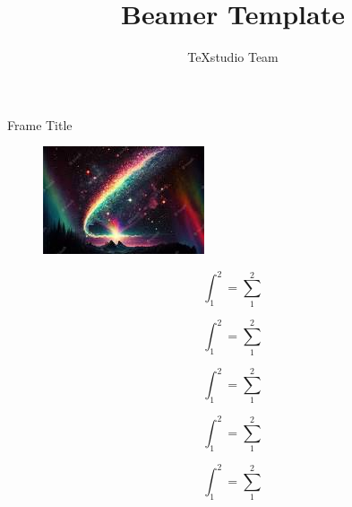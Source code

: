 \documentclass{beamer}
\title{Beamer Template}
\author{TeXstudio Team}
\begin{document}
\begin{frame}[plain]
	\maketitle
\end{frame}
\begin{frame}{Frame Title}
	\begin{figure}
		\centering
		\includegraphics[width=0.7\linewidth]{screenshot001}
		\caption{}
		\label{fig:screenshot001}
	\end{figure}

\end{frame}
\begin{frame}
	\begin{equation}\label{key}
		\int_{1}^{2}=\sum_{1}^{2}
	\end{equation}
\end{frame}
\begin{frame}
	\begin{equation}\label{key}
		\int_{1}^{2}=\sum_{1}^{2}
	\end{equation}
\end{frame}
\begin{frame}
	\begin{equation}\label{key}
		\int_{1}^{2}=\sum_{1}^{2}
	\end{equation}
\end{frame}
\begin{frame}
	\begin{equation}\label{key}
		\int_{1}^{2}=\sum_{1}^{2}
	\end{equation}
\end{frame}
\begin{frame}
	\begin{equation}\label{key}
		\int_{1}^{2}=\sum_{1}^{2}
	\end{equation}
\end{frame}
\end{document}
